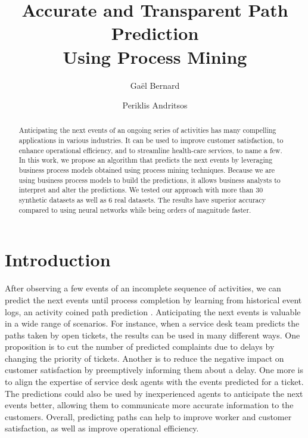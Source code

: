 \documentclass[runningheads]{llncs}
\begin{document}
%
\title{Accurate and Transparent Path Prediction \\ Using Process Mining}
%
%
\author{Ga{\"e}l Bernard \and
Periklis Andritsos}
%
%
%
\maketitle 

\begin{abstract}
Anticipating the next events of an ongoing series of activities has many compelling applications in various industries. It can be used to improve customer satisfaction, to enhance operational efficiency, and to streamline health-care services, to name a few. In this work, we propose an algorithm that predicts the next events by leveraging business process models obtained using process mining techniques. Because we are using business process models to build the predictions, it allows business analysts to interpret and alter the predictions. We tested our approach with more than 30 synthetic datasets as well as 6 real datasets. The results have superior accuracy compared to using neural networks while being orders of magnitude faster.

\end{abstract}


\section{Introduction}

After observing a few events of an incomplete sequence of activities, we can predict the next events until process completion by learning from historical event logs, an activity coined path prediction \cite{polato2018time}. Anticipating the next events is valuable in a wide range of scenarios. For instance, when a service desk team predicts the paths taken by open tickets, the results can be used in many different ways. One proposition is to cut the number of predicted complaints due to delays by changing the priority of tickets. Another is to reduce the negative impact on customer satisfaction by preemptively informing them about a delay. One more is to align the expertise of service desk agents with the events predicted for a ticket. The predictions could also be used by inexperienced agents to anticipate the next events better, allowing them to communicate more accurate information to the customers. Overall, predicting paths can help to improve worker and customer satisfaction, as well as improve operational efficiency.
\end{document}

